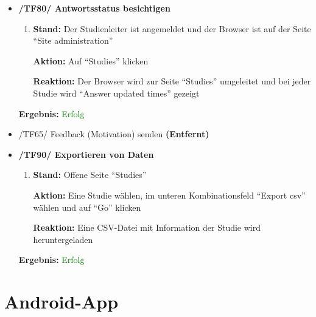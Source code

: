 \documentclass[a4paper]{scrreprt}
\begin{document}
\begin{itemize}
                \item \textbf{/TF80/ Antwortsstatus besichtigen}
                    \begin{enumerate}
                        \item \par \textbf{Stand: } Der Studienleiter ist angemeldet und der Browser ist auf der Seite ``Site administration''
                              \par \textbf{Aktion: }Auf ``Studies'' klicken
                              \par \textbf{Reaktion: }Der Browser wird zur Seite ``Studies'' umgeleitet und bei jeder Studie wird ``Answer updated times'' gezeigt
                    \end{enumerate}		       
					\vspace*{0.3cm}
		           \par \textbf{Ergebnis: }\textcolor{green}{Erfolg}
		           \vspace*{0.6cm} 	
		           
				\item /TF65/ Feedback (Motivation) senden \textbf{(Entfernt)}	
				\vspace*{0.6cm}	
				
                \item \textbf{/TF90/ Exportieren von Daten}
                \begin{enumerate}
                    \item \par \textbf{Stand: }Offene Seite ``Studies''
                          \par \textbf{Aktion: }Eine Studie w\"ahlen, im unteren Kombinationsfeld ``Export csv'' w\"ahlen und auf ``Go'' klicken
                          \par \textbf{Reaktion: }Eine CSV-Datei mit Information der Studie wird heruntergeladen
                \end{enumerate}	
					\vspace*{0.3cm}
		           \par \textbf{Ergebnis: }\textcolor{green}{Erfolg}
		           \vspace*{0.6cm}                 			           
		           
		           \end{itemize}      
	      
	      \section{Android-App} 
	      
\end{document}
